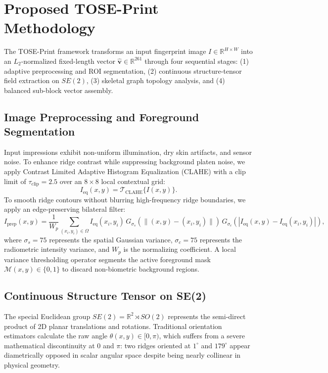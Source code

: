 \documentclass[lettersize,journal]{IEEEtran}
\begin{document}
\section{Proposed TOSE-Print Methodology}
\label{sec:methodology}

The TOSE-Print framework transforms an input fingerprint image $I \in \mathbb{R}^{H \times W}$ into an $L_2$-normalized fixed-length vector $\hat{\mathbf{v}} \in \mathbb{R}^{261}$ through four sequential stages: (1) adaptive preprocessing and ROI segmentation, (2) continuous structure-tensor field extraction on $SE(2)$, (3) skeletal graph topology analysis, and (4) balanced sub-block vector assembly.

\subsection{Image Preprocessing and Foreground Segmentation}
Input impressions exhibit non-uniform illumination, dry skin artifacts, and sensor noise. To enhance ridge contrast while suppressing background platen noise, we apply Contrast Limited Adaptive Histogram Equalization (CLAHE) \cite{b1} with a clip limit of $\tau_{\text{clip}} = 2.5$ over an $8 \times 8$ local contextual grid:
\begin{equation}
    I_{\text{eq}}(x, y) = \mathcal{T}_{\text{CLAHE}}\{I(x, y)\}.
\end{equation}
To smooth ridge contours without blurring high-frequency ridge boundaries, we apply an edge-preserving bilateral filter:
\begin{equation}
    I_{\text{prep}}(x, y) = \frac{1}{W_p} \sum_{(x_i, y_i) \in \Omega} I_{\text{eq}}(x_i, y_i) \, G_{\sigma_s}(\|(x, y) - (x_i, y_i)\|) \, G_{\sigma_c}(|I_{\text{eq}}(x, y) - I_{\text{eq}}(x_i, y_i)|),
\end{equation}
where $\sigma_s = 75$ represents the spatial Gaussian variance, $\sigma_c = 75$ represents the radiometric intensity variance, and $W_p$ is the normalizing coefficient. A local variance thresholding operator segments the active foreground mask $\mathcal{M}(x, y) \in \{0, 1\}$ to discard non-biometric background regions.

\subsection{Continuous Structure Tensor on SE(2)}
The special Euclidean group $SE(2) = \mathbb{R}^2 \rtimes SO(2)$ represents the semi-direct product of 2D planar translations and rotations. Traditional orientation estimators calculate the raw angle $\theta(x, y) \in [0, \pi)$, which suffers from a severe mathematical discontinuity at $0$ and $\pi$: two ridges oriented at $1^\circ$ and $179^\circ$ appear diametrically opposed in scalar angular space despite being nearly collinear in physical geometry.
\end{document}
